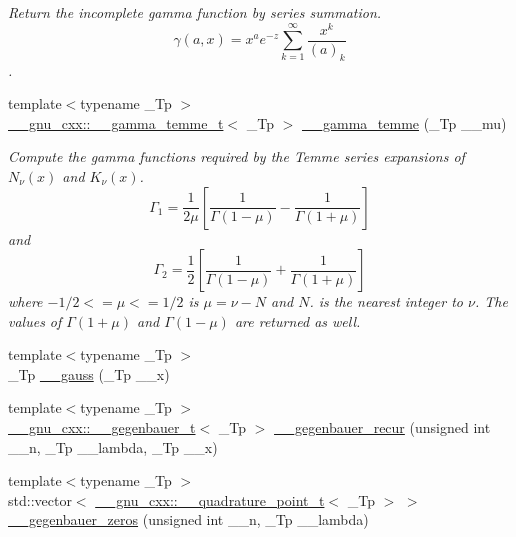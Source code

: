 \begin{DoxyCompactItemize}
\begin{DoxyCompactList}\small\item\em Return the incomplete gamma function by series summation. \[ \gamma(a,x) = x^a e^{-z}\sum_{k=1}^{\infty} \frac{x^k}{(a)_k} \]. \end{DoxyCompactList}\item 
{\footnotesize template$<$typename \+\_\+\+Tp $>$ }\\\hyperlink{struct____gnu__cxx_1_1____gamma__temme__t}{\+\_\+\+\_\+gnu\+\_\+cxx\+::\+\_\+\+\_\+gamma\+\_\+temme\+\_\+t}$<$ \+\_\+\+Tp $>$ \hyperlink{namespacestd_1_1____detail_a0d4fa90f527fd05d057b27ba0366488a}{\+\_\+\+\_\+gamma\+\_\+temme} (\+\_\+\+Tp \+\_\+\+\_\+mu)
\begin{DoxyCompactList}\small\item\em Compute the gamma functions required by the Temme series expansions of $ N_\nu(x) $ and $ K_\nu(x) $. \[ \Gamma_1 = \frac{1}{2\mu} \left[\frac{1}{\Gamma(1 - \mu)} - \frac{1}{\Gamma(1 + \mu)}\right] \] and \[ \Gamma_2 = \frac{1}{2} \left[\frac{1}{\Gamma(1 - \mu)} + \frac{1}{\Gamma(1 + \mu)}\right] \] where $ -1/2 <= \mu <= 1/2 $ is $ \mu = \nu - N $ and $ N $. is the nearest integer to $ \nu $. The values of $ \Gamma(1 + \mu) $ and $ \Gamma(1 - \mu) $ are returned as well. \end{DoxyCompactList}\item 
{\footnotesize template$<$typename \+\_\+\+Tp $>$ }\\\+\_\+\+Tp \hyperlink{namespacestd_1_1____detail_afdb25beb2328b74d64d9be03de64c442}{\+\_\+\+\_\+gauss} (\+\_\+\+Tp \+\_\+\+\_\+x)
\item 
{\footnotesize template$<$typename \+\_\+\+Tp $>$ }\\\hyperlink{struct____gnu__cxx_1_1____gegenbauer__t}{\+\_\+\+\_\+gnu\+\_\+cxx\+::\+\_\+\+\_\+gegenbauer\+\_\+t}$<$ \+\_\+\+Tp $>$ \hyperlink{namespacestd_1_1____detail_a34e6b1cce7eca17d0929284577124747}{\+\_\+\+\_\+gegenbauer\+\_\+recur} (unsigned int \+\_\+\+\_\+n, \+\_\+\+Tp \+\_\+\+\_\+lambda, \+\_\+\+Tp \+\_\+\+\_\+x)
\item 
{\footnotesize template$<$typename \+\_\+\+Tp $>$ }\\std\+::vector$<$ \hyperlink{struct____gnu__cxx_1_1____quadrature__point__t}{\+\_\+\+\_\+gnu\+\_\+cxx\+::\+\_\+\+\_\+quadrature\+\_\+point\+\_\+t}$<$ \+\_\+\+Tp $>$ $>$ \hyperlink{namespacestd_1_1____detail_ae009135e8f2dfd9e97694c778a15ce08}{\+\_\+\+\_\+gegenbauer\+\_\+zeros} (unsigned int \+\_\+\+\_\+n, \+\_\+\+Tp \+\_\+\+\_\+lambda)
\item 

\end{DoxyCompactItemize}

